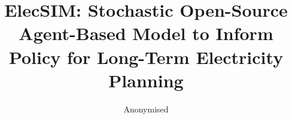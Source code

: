 \documentclass[sigconf]{acmart}
\begin{document}
%
\title[ElecSIM: Agent-Based Model to Inform Policy for Long-Term Electricity Planning]{ElecSIM: Stochastic Open-Source Agent-Based Model to Inform Policy for Long-Term Electricity Planning}

%

\author{Anonymised}

%
%
 
%

%
\begin{abstract}


\end{abstract}

%
%

%


%
\end{document}
